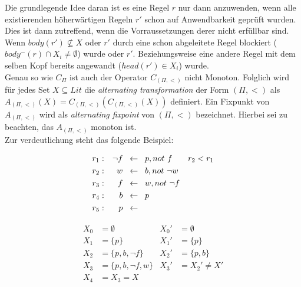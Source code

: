 Die grundlegende Idee daran ist es eine Regel $r$ nur dann anzuwenden, wenn alle
existierenden höherwärtigen Regeln $r'$ schon auf Anwendbarkeit geprüft wurden.
Dies ist dann zutreffend, wenn die Vorraussetzungen derer nicht erfüllbar sind.
Wenn $body(r') \not\subseteq X$ oder $r'$ durch eine schon abgeleitete Regel blockiert
($body^-(r) \cap X_i \neq \emptyset$) wurde oder $r'$.
Beziehungsweise eine andere Regel mit
dem selben Kopf bereits angewandt ($head(r') \in X_i$) wurde.\\
Genau so wie $C_\Pi$ ist auch der Operator $C_{(\Pi, <)}$ nicht Monoton.
Folglich wird für jedes Set $X \subseteq Lit$ die \emph{alternating transformation}
der Form $(\Pi, <)$ als $A_{(\Pi, <)}(X) = C_{(\Pi, <)}(C_{(\Pi, <)}(X))$ definiert.
Ein Fixpunkt von $A_{(\Pi, <)}$ wird als \emph{alternating fixpoint} von $(\Pi, <)$
bezeichnet. Hierbei sei zu beachten, das $A_{(\Pi, <)}$ monoton ist.\\



Zur verdeutlichung steht das folgende Beispiel:\\
  \begin{example}[$\Pi_2, <$]
    \begin{align*}
      r_1: && \neg f \hspace*{0.2cm}&\leftarrow \hspace*{0.2cm}p, not~f &  r_2 < r_1\\
      r_2: && w \hspace*{0.2cm}&\leftarrow \hspace*{0.2cm}b, not~\neg w \\
      r_3: && f \hspace*{0.2cm}&\leftarrow \hspace*{0.2cm}w, not~\neg f \\
      r_4: && b \hspace*{0.2cm}&\leftarrow \hspace*{0.2cm}p \\
      r_5: && p \hspace*{0.2cm}&\leftarrow
    \end{align*}
    \label{example:pi2}
  \end{example}



\begin{align*}
  X_0 &= \emptyset           & X_0' &= \emptyset \\
  X_1 &= \{p\}               & X_1' &= \{p\} \\
  X_2 &= \{p, b, \neg f\}    & X_2' &= \{p, b\} \\
  X_3 &= \{p, b, \neg f, w\} & X_3' &= X_2' \not = X' \\
  X_4 &= X_3 = X
\end{align*}








